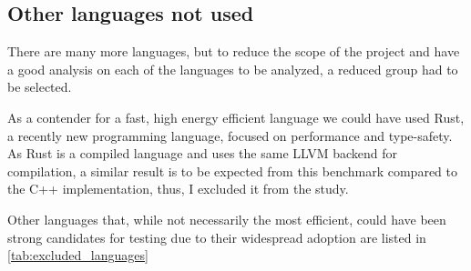 \subsection{Other languages not used}

There are many more languages, but to reduce the scope of the project and have a good analysis on each of the languages to be analyzed, a reduced group had to be selected. 

As a contender for a fast, high energy efficient language we could have used Rust, a recently new programming language, focused on performance and type-safety. As Rust is a compiled language and uses the same \gls{LLVM} backend for compilation, a similar result is to be expected from this benchmark compared to the C++ implementation, thus, I excluded it from the study.

Other languages that, while not necessarily the most efficient, could have been strong candidates for testing due to their widespread adoption are listed in \autoref{tab:excluded_languages}

